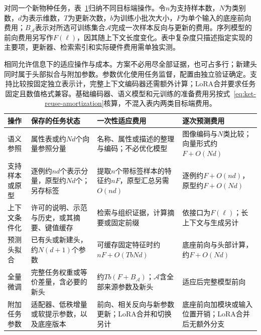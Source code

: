 对同一个新物种任务，表~\ref{tab:ket-transfer-operation-cost}归纳不同目标端操作。令$n$为支持样本数，$N$为类别数，$d$为表示维数，$T$为更新次数，$b$为训练小批次大小，$F$为单个输入的底座前向费用；$B_{\mathcal A}$表示对所选可训练集合$\mathcal A$完成一次样本反向与更新的费用。序列模型的前向费用另写作$F(\ell)$，因其随上下文长度变化。表中复杂度只描述指定实现的主要项，更新器、检索索引和实际硬件费用需单独实测。

\begin{table}[htbp]
  \centering
  \small
  \setlength{\tabcolsep}{4pt}
  \renewcommand{\arraystretch}{1.2}
  \begin{tabularx}{\linewidth}{@{}>{\raggedright\arraybackslash}p{24mm}
      >{\raggedright\arraybackslash}p{36mm}
      >{\raggedright\arraybackslash}X
      >{\raggedright\arraybackslash}X@{}}
    \toprule
    操作 & 保存的任务状态 & 一次性适应费用 & 逐次预测费用 \\
    \midrule
    语义参照 & 属性表或约$Nd$个向量参照分量 & 名称、属性或描述的整理与编码；不必优化模型 & 图像编码与$N$类比较；向量形式约$F+O(Nd)$ \\
    \addlinespace
    支持样本或原型 & 逐例约$nd$个表示分量，原型约$Nd$个；另存标签 & 提取$n$个带标签样本的特征约$nF$，原型汇总另需$O(nd)$ & 逐例约$F+O(nd)$，原型约$F+O(Nd)$ \\
    \addlinespace
    上下文条件化 & 许可的说明、示范与历史，或其摘要、键值缓存 & 检索与组织证据，计算摘要或固定前缀 & 依接口为$F(\ell)$；长上下文与生成另计 \\
    \addlinespace
    预测头拟合 & 已有头或新建头，约$N(d+1)$个参数 & 可缓存固定特征时约$nF+O(TbNd)$ & 底座前向与头部计算，约$F+O(Nd)$ \\
    \addlinespace
    全量微调 & 完整任务权重或等价差量，含必要的新头 & 约$Tb(F+B_{\mathcal A})$；$\mathcal A$含全部来源参数及新头 & 适应后完整模型前向 \\
    \addlinespace
    附加任务参数 & 适配器、低秩增量或软提示参数，以及底座版本 & 前向、相关反向与新参数更新；LoRA合并和切换另计 & 底座前向加模块或输入位置开销；LoRA合并后无额外分支 \\
    \bottomrule
  \end{tabularx}
  \caption{相同允许信息下的适应操作与成本。方案不必用尽全部证据，也可占多行；新建头同时属于头部拟合与附加参数。参数优化使用任务监督，配置由独立验证确定。支持比较按固定独立表示计，完整上下文编码器还需额外计算；LoRA合并要求任务固定且数值格式兼容。基础编码器、语义模型和元训练的准备费用另按式~\eqref{eq:ket-reuse-amortization}核算，不混入表内两类目标端费用。}
  \label{tab:ket-transfer-operation-cost}
\end{table}


